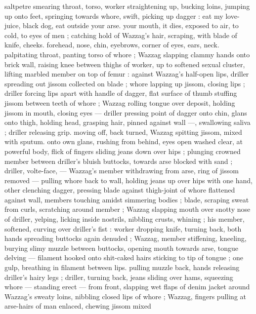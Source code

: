 saltpetre smearing throat, torso, worker straightening up, bucking 
loins, jumping up onto feet, springing towards whore, swift, picking 
up dagger : {\gl}{\thd} eat my love-juice, black dog, eat{\thd} outside your arse. 
your mouth, it dies, exposed to air, to cold, to eyes of men{\thd}{\gr} ; 
catching hold of Wazzag's hair, scraping, with blade of knife, cheeks. 
forehead, nose, chin, eyebrows, corner of eyes, ears, neck. 
palpitating throat, panting torso of whore ; Wazzag slapping clammy 
hands onto brick wall, raising knee between thighs of worker, up to 
softened sexual cluster, lifting marbled member on top of femur : 
against Wazzag's half-open lips, driller spreading out jissom 
collected on blade ; whore lapping up jissom, closing lips ; driller 
forcing lips apart with handle of dagger, flat surface of thumb 
stuffing jissom between teeth of whore ; Wazzag rolling tongue over 
deposit, holding jissom in mouth, closing eyes --- driller pressing 
point of dagger onto chin, glans onto thigh, holding head, grasping 
hair, pinned against wall ---, swallowing saliva ; driller releasing grip. 
moving off, back turned, Wazzag spitting jissom, mixed with sputum. 
onto own glans, rushing from behind, eyes open washed clear, at 
powerful body, flick of fingers sliding jeans down over hips ; plunging 
crowned member between driller's bluish buttocks, towards arse 
blocked with sand ; driller, volte-face, --- Wazzag's member 
withdrawing from arse, ring of jissom removed --- pulling whore back 
to wall, holding jeans up over hips with one hand, other clenching 
dagger, pressing blade against thigh-joint of whore flattened against 
wall, members touching amidst simmering bodies ; blade, scraping 
sweat from curls, scratching around member ; Wazzag slapping 
mouth over snotty nose of driller, yelping, licking inside nostrils, 
nibbling crusts, whining ; his member, softened, curving over driller's 
fist : worker dropping knife, turning back, both hands spreading 
buttocks again denuded ; Wazzag, member stiffening, kneeling, 
burying slimy muzzle between buttocks, opening mouth towards 
arse, tongue delving --- filament hooked onto shit-caked hairs 
sticking to tip of tongue ; one gulp, breathing in filament between 
lips. pulling muzzle back, hands releasing driller's hairy legs ; driller, 
turning back, jeans sliding over hams, squeezing whore --- standing 
erect --- from front, slapping wet flaps of denim jacket around 
Wazzag's sweaty loins, nibbling closed lips of whore ; Wazzag, 
fingers pulling at arse-hairs of man enlaced, chewing jissom mixed 
